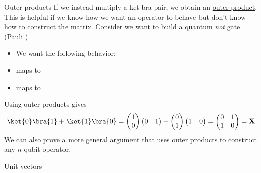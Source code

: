\begin{frame}{Outer products}
If we instead multiply a ket-bra pair, we obtain an \href{https://en.wikipedia.org/wiki/Outer_product}{outer product}.
This is helpful if we know how we want an operator to behave but don't know how to construct the matrix. Consider we want to build a quantum \emph{not} gate (Pauli \PauliX)
\begin{itemize}
    \item We want the following behavior:
    \item {} maps to 
    \item {} maps to 
\end{itemize}
Using outer products gives
\[\ket{0}\bra{1} + \ket{1}\bra{0} = 
\begin{pmatrix}
1 \\ 0
\end{pmatrix}
\begin{pmatrix}
0 & 1
\end{pmatrix}
+
\begin{pmatrix}
0 \\ 1
\end{pmatrix}
\begin{pmatrix}
1 & 0
\end{pmatrix}
= 
\begin{pmatrix}
0 & 1 \\
1 & 0
\end{pmatrix}
= \PauliX{}
\]
We can also prove a more general argument that uses outer products to construct any $n$-qubit operator.
\end{frame}

\begin{frame}{Unit vectors}

\end{frame}


